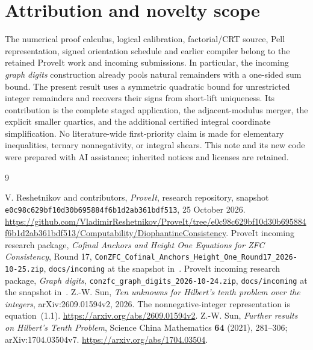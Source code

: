 \documentclass[10pt,letterpaper]{article}
\theoremstyle{definition}\newtheorem{definition}[theorem]{Definition}
\begin{document}
\section*{Attribution and novelty scope}
The numerical proof calculus, logical calibration, factorial/CRT source,
Pell representation, signed orientation schedule and earlier compiler
belong to the retained ProveIt work and incoming submissions. In particular,
the incoming \textit{graph digits} construction already pools natural
remainders with a one-sided sum bound. The present result uses a symmetric
quadratic bound for unrestricted integer remainders and recovers their
signs from short-lift uniqueness. Its contribution is the complete staged
application, the adjacent-modulus merger, the explicit smaller quartics,
and the additional certified integral coordinate simplification. No
literature-wide first-priority claim is made for elementary inequalities,
ternary nonnegativity, or integral shears. This note and its new code were
prepared with AI assistance; inherited notices and licenses are retained.

\begingroup\small\setlength{\parskip}{0pt}
\begin{thebibliography}{9}
\raggedright\setlength{\itemsep}{2pt}\setlength{\parsep}{0pt}
 V. Reshetnikov and contributors,
\textit{ProveIt}, research repository, snapshot
\texttt{e0c98c629bf10d30b695884f6b1d2ab361bdf513}, 25 October 2026.
\url{https://github.com/VladimirReshetnikov/ProveIt/tree/e0c98c629bf10d30b695884f6b1d2ab361bdf513/Computability/DiophantineConsistency}.
 ProveIt incoming research package,
\textit{Cofinal Anchors and Height One Equations for ZFC Consistency},
Round 17, \texttt{ConZFC\_Cofinal\_Anchors\_Height\_One\_Round17\_2026-10-25.zip},
\texttt{docs/incoming} at the snapshot in~\cite{repo}.
 ProveIt incoming research package,
\textit{Graph digits}, \texttt{conzfc\_graph\_digits\_2026-10-24.zip},
\texttt{docs/incoming} at the snapshot in~\cite{repo}.
 Z.-W. Sun,
\textit{Ten unknowns for Hilbert's tenth problem over the integers},
arXiv:2609.01594v2, 2026. The nonnegative-integer representation is
equation~(1.1). \url{https://arxiv.org/abs/2609.01594v2}.
 Z.-W. Sun,
\textit{Further results on Hilbert's Tenth Problem},
Science China Mathematics \textbf{64} (2021), 281--306;
arXiv:1704.03504v7. \url{https://arxiv.org/abs/1704.03504}.
\end{thebibliography}
\endgroup
\end{document}
